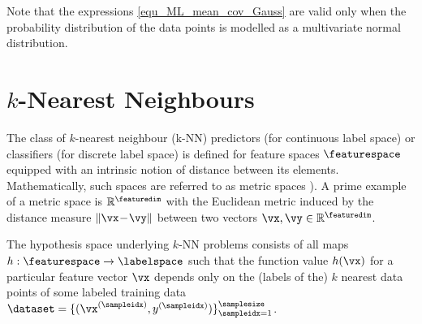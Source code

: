 \documentclass[12pt]{report}
\begin{document}
Note that the expressions \eqref{equ_ML_mean_cov_Gauss} 
are valid only when the probability distribution of the data points is 
modelled as a multivariate normal distribution. 

\section{$k$-Nearest Neighbours} 
The class of $k$-nearest neighbour (k-NN) predictors (for continuous label space) or 
classifiers (for discrete label space) is defined for feature spaces $\featurespace$ equipped 
with an intrinsic notion of distance between its elements. Mathematically, such spaces are 
referred to as metric spaces \cite{RudinBookPrinciplesMatheAnalysis}). A prime example of a 
metric space is $\mathbb{R}^{\featuredim}$ with the Euclidean metric induced by the distance 
measure $\| \vx\!-\!\vy \|$ between two vectors $\vx, \vy \in \mathbb{R}^{\featuredim}$. 

The hypothesis space underlying $k$-NN problems consists of all maps $h: \featurespace \rightarrow \labelspace$ 
such that the function value $h(\vx)$ for a particular feature vector $\vx$ depends only on the (labels of the) $k$ 
nearest data points of some labeled training data $\dataset = \{ (\vx^{(\sampleidx)},y^{(\sampleidx)}) \}_{\sampleidx=1}^{\samplesize}$. 
\end{document}
